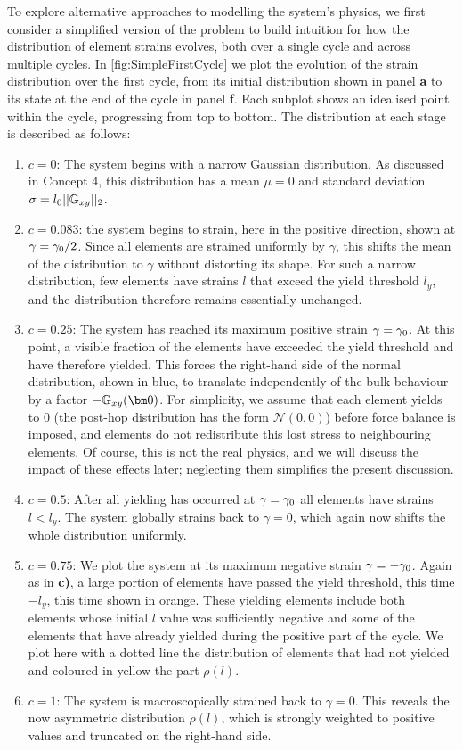 To explore alternative approaches to modelling the system’s physics, we first consider a simplified version of the problem to build intuition for how the distribution of element strains evolves, both over a single cycle and across multiple cycles. In \cref{fig:SimpleFirstCycle} we plot the evolution of the strain distribution over the first cycle, from its initial distribution shown in panel {\bf a} to its state at the end of the cycle in panel {\bf f}. Each subplot shows an idealised point within the cycle, progressing from top to bottom. The distribution at each stage is described as follows:
\begin{enumerate}[label=\textbf{\alph*)}]
    \item $c=0$: The system begins with a narrow Gaussian distribution. As discussed in Concept 4, this distribution has a mean $\mu=0$ and standard deviation $\sigma=l_0||\mathbb{G}_{xy}||_2$.
    \item $c=0.083$: the system begins to strain, here in the positive direction, shown at $\gamma=\gamma_0/2$. Since all elements are strained uniformly by $\gamma$, this shifts the mean of the distribution to $\gamma$ without distorting its shape. For such a narrow distribution, few elements have strains $l$ that exceed the yield threshold $l_y$, and the distribution therefore remains essentially unchanged.
    \item $c=0.25$: The system has reached its maximum positive strain $\gamma=\gamma_0$. At this point, a visible fraction of the elements have exceeded the yield threshold and have therefore yielded. This forces the right-hand side of the normal distribution, shown in blue, to translate independently of the bulk behaviour by a factor $-\Origin$. For simplicity, we assume that each element yields to $0$ (the post-hop distribution has the form $\mathcal{N}(0,0)$) before force balance is imposed, and elements do not redistribute this lost stress to neighbouring elements. Of course, this is not the real physics, and we will discuss the impact of these effects later; neglecting them simplifies the present discussion. 
    \item $c=0.5$: After all yielding has occurred at $\gamma=\gamma_0$ all elements have strains $l<l_y$. The system globally strains back to $\gamma=0$, which again now shifts the whole distribution uniformly.
    \item $c=0.75$: We plot the system at its maximum negative strain $\gamma=-\gamma_0$. Again as in {\bf c)}, a large portion of elements have passed the yield threshold, this time $-l_y$, this time shown in orange. These yielding elements include both elements whose initial $l$ value was sufficiently negative and some of the elements that have already yielded during the positive part of the cycle. We plot here with a dotted line the distribution of elements that had not yielded and coloured in yellow the part $\rho(l)$. 
    \item $c=1$: The system is macroscopically strained back to $\gamma=0$. This reveals the now asymmetric distribution $\rho(l)$, which is strongly weighted to positive values and truncated on the right-hand side.  
\end{enumerate}

